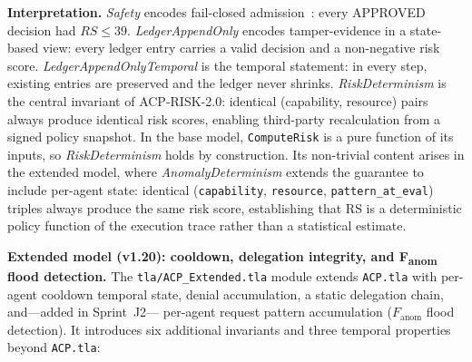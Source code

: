 \documentclass[11pt]{article}
\theoremstyle{definition}
\begin{document}
\noindent\textbf{Interpretation.}
\textit{Safety} encodes fail-closed admission~\cite{saltzer1975}: every APPROVED decision had $\mathit{RS} \leq 39$.
\textit{LedgerAppendOnly} encodes tamper-evidence in a state-based view:
every ledger entry carries a valid decision and a non-negative risk score.
\textit{LedgerAppendOnlyTemporal} is the temporal statement: in every step,
existing entries are preserved and the ledger never shrinks.
\textit{RiskDeterminism} is the central invariant of ACP-RISK-2.0: identical
(capability, resource) pairs always produce identical risk scores,
enabling third-party recalculation from a signed policy snapshot.
In the base model, \texttt{ComputeRisk} is a pure function of its inputs, so
\textit{RiskDeterminism} holds by construction.
Its non-trivial content arises in the extended model, where
\textit{AnomalyDeterminism} extends the guarantee to include per-agent state:
identical (\texttt{capability}, \texttt{resource}, \texttt{pattern\_at\_eval}) triples
always produce the same risk score, establishing that RS is a deterministic policy
function of the execution trace rather than a statistical estimate.

\noindent\textbf{Extended model (v1.20): cooldown, delegation integrity, and F\textsubscript{anom} flood detection.}
The \texttt{tla/ACP\_Extended.tla} module extends \texttt{ACP.tla} with per-agent cooldown
temporal state, denial accumulation, a static delegation chain, and---added in Sprint~J2---%
per-agent request pattern accumulation ($F_{\text{anom}}$ flood detection).
It introduces six additional invariants and three temporal properties beyond \texttt{ACP.tla}:
\end{document}
